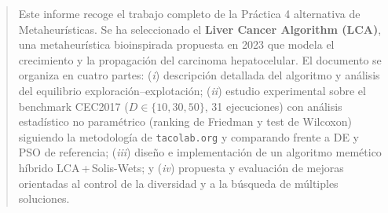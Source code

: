 \begin{titlepage}
\vfill
\newpage
\begin{abstract}
\noindent
Este informe recoge el trabajo completo de la Práctica 4 alternativa de Metaheurísticas.
Se ha seleccionado el \textbf{Liver Cancer Algorithm (LCA)}, una metaheurística bioinspirada
propuesta en 2023 que modela el crecimiento y la propagación del carcinoma hepatocelular.
El documento se organiza en cuatro partes: (\textit{i}) descripción detallada del algoritmo y
análisis del equilibrio exploración–explotación; (\textit{ii}) estudio experimental sobre el
benchmark CEC2017 ($D\in\{10,30,50\}$, 31 ejecuciones) con análisis estadístico no paramétrico
(ranking de Friedman y test de Wilcoxon) siguiendo la metodología de \texttt{tacolab.org} y
comparando frente a DE y PSO de referencia; (\textit{iii}) diseño e implementación de un
algoritmo memético híbrido LCA\,+\,Solis-Wets; y (\textit{iv}) propuesta y evaluación de mejoras
orientadas al control de la diversidad y a la búsqueda de múltiples soluciones.
\end{abstract}

\end{titlepage}
\newpage
